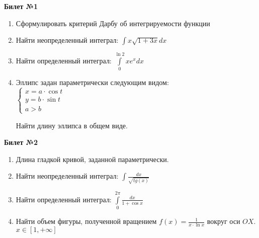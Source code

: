 \documentclass[a4paper, 12pt]{article}
\begin{document}
\begin{center}
    \textbf{Билет №1}
\end{center}
\begin{enumerate}
\item Сформулировать критерий Дарбу об интегрируемости функции
\item Найти неопределенный интеграл: $ \displaystyle \int{x\sqrt{1+3x}}dx$
\item Найти определенный интеграл: $\displaystyle \int\limits_{0}^{\ln{2}}{xe^xdx}$
\item Эллипс задан параметрически следующим видом: \\ 

$
	\begin{cases}
		x = a\cdot\cos{t} \\
		y=b\cdot\sin{t} \\
		a > b
		
	\end{cases}
$

Найти длину эллипса в общем виде.

\end{enumerate}

\begin{center}
	\textbf{Билет №2}
\end{center}
\begin{enumerate}
	\item Длина гладкой кривой, заданной параметрически.
	\item Найти неопределенный интеграл: $\displaystyle \int{\frac{dx}{\sqrt{tg(x)}}}$
	\item Найти определенный интеграл: $\displaystyle \int\limits_{0}^{2\pi}{\frac{dx}{1+\cos{x}}}$
	\item Найти объем фигуры, полученной вращением $\displaystyle f(x) = \frac{1}{x \cdot \ln{x}}$ вокруг оси $OX$. $\displaystyle x \in \left[1,+\infty\right]$
	
\end{enumerate}
\end{document}
